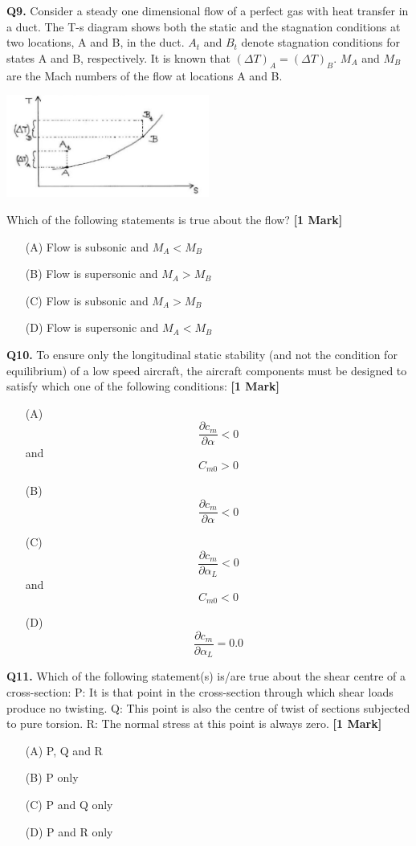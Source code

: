 \documentclass[11pt]{article}
\newcommand{\questiona}[2]{
    \noindent\textbf{Q#2.} #1 \hfill \textbf{[1 Mark]}
}
\begin{document}
\questiona{Consider a steady one dimensional flow of a perfect gas with heat transfer in a duct. The T-s diagram shows both the static and the stagnation conditions at two locations, A and B, in the duct. \( A_t \) and \( B_t \) denote stagnation conditions for states A and B, respectively. It is known that \( (\Delta T)_A = (\Delta T)_B \). \( M_A \) and \( M_B \) are the Mach numbers of the flow at locations A and B. 
\begin{center}
\includegraphics[width=0.5\textwidth]{figures/9.png}
\end{center}
Which of the following statements is true about the flow?}{9}
\begin{enumerate}
    \item[(A)] Flow is subsonic and \( M_A < M_B \)
    \item[(B)] Flow is supersonic and \( M_A > M_B \)
    \item[(C)] Flow is subsonic and \( M_A > M_B \)
    \item[(D)] Flow is supersonic and \( M_A < M_B \)
\end{enumerate}

\vspace{0.5cm}

\questiona{To ensure only the longitudinal static stability (and not the condition for equilibrium) of a low speed aircraft, the aircraft components must be designed to satisfy which one of the following conditions:}{10}
\begin{enumerate}
    \item[(A)] \[ \frac{\partial c_m}{\partial \alpha} < 0 \] and \[ C_{m0} > 0 \]
    \item[(B)] \[ \frac{\partial c_m}{\partial \alpha} < 0 \]
    \item[(C)] \[ \frac{\partial c_m}{\partial \alpha_L} < 0 \] and \[ C_{m0} < 0 \]
    \item[(D)] \[ \frac{\partial c_m}{\partial \alpha_L} = 0.0 \]
\end{enumerate}

\vspace{0.5cm}

\questiona{Which of the following statement(s) is/are true about the shear centre of a cross-section:  
P: It is that point in the cross-section through which shear loads produce no twisting.  
Q: This point is also the centre of twist of sections subjected to pure torsion.  
R: The normal stress at this point is always zero.}{11}
\begin{enumerate}
    \item[(A)] P, Q and R  
    \item[(B)] P only  
    \item[(C)] P and Q only  
    \item[(D)] P and R only
\end{enumerate}
\end{document}
